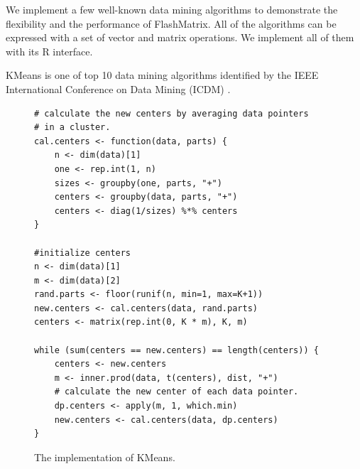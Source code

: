 We implement a few well-known data mining algorithms to demonstrate
the flexibility and the performance of FlashMatrix. All of the algorithms
can be expressed with a set of vector and matrix operations. We implement
all of them with its R interface.

KMeans is one of top 10 data mining algorithms identified by the IEEE
International Conference on Data Mining (ICDM) \cite{top10}.

\begin{figure}[t]
\begin{lstlisting}
# calculate the new centers by averaging data pointers
# in a cluster.
cal.centers <- function(data, parts) {
	n <- dim(data)[1]
	one <- rep.int(1, n)
	sizes <- groupby(one, parts, "+")
	centers <- groupby(data, parts, "+")
	centers <- diag(1/sizes) %*% centers
}

#initialize centers
n <- dim(data)[1]
m <- dim(data)[2]
rand.parts <- floor(runif(n, min=1, max=K+1))
new.centers <- cal.centers(data, rand.parts)
centers <- matrix(rep.int(0, K * m), K, m)

while (sum(centers == new.centers) == length(centers)) {
	centers <- new.centers
	m <- inner.prod(data, t(centers), dist, "+")
	# calculate the new center of each data pointer.
	dp.centers <- apply(m, 1, which.min)
	new.centers <- cal.centers(data, dp.centers)
}
\end{lstlisting}
\vspace{-5pt}
\caption{The implementation of KMeans.}
\label{fig:kmeans}
\end{figure}

